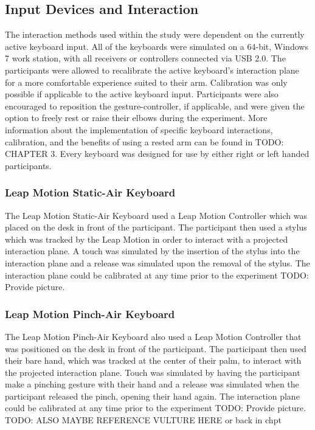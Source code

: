 \subsection{Input Devices and Interaction}

The interaction methods used within the study were dependent on the currently active keyboard input. All of the keyboards were simulated on a 64-bit, Windows 7 work station, with all receivers or controllers connected via USB 2.0. The participants were allowed to recalibrate the active keyboard's interaction plane for a more comfortable experience suited to their arm. Calibration was only possible if applicable to the active keyboard input. Participants were also encouraged to reposition the gesture-controller, if applicable, and were given the option to freely rest or raise their elbows during the experiment. More information about the implementation of specific keyboard interactions, calibration, and the benefits of using a rested arm can be found in TODO: CHAPTER 3. Every keyboard was designed for use by either right or left handed participants.

\subsubsection{Leap Motion Static-Air Keyboard}

The Leap Motion Static-Air Keyboard used a Leap Motion Controller which was placed on the desk in front of the participant. The participant then used a stylus which was tracked by the Leap Motion in order to interact with a projected interaction plane. A touch was simulated by the insertion of the stylus into the interaction plane and a release was simulated upon the removal of the stylus. The interaction plane could be calibrated at any time prior to the experiment TODO: Provide picture.

\subsubsection{Leap Motion Pinch-Air Keyboard}

The Leap Motion Pinch-Air Keyboard also used a Leap Motion Controller that was positioned on the desk in front of the participant. The participant then used their bare hand, which was tracked at the center of their palm, to interact with the projected interaction plane. Touch was simulated by having the participant make a pinching gesture with their hand and a release was simulated when the participant released the pinch, opening their hand again. The interaction plane could be calibrated at any time prior to the experiment TODO: Provide picture. TODO: ALSO MAYBE REFERENCE VULTURE HERE or back in chpt

